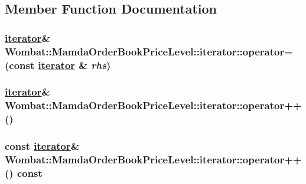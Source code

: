 \subsection{Member Function Documentation}
\hypertarget{classWombat_1_1MamdaOrderBookPriceLevel_1_1iterator_01e1214e92aa3b3a43ef784abdbb20c9}{
\subsubsection[operator=]{\setlength{\rightskip}{0pt plus 5cm}\hyperlink{classWombat_1_1MamdaOrderBookPriceLevel_1_1iterator}{iterator}\& Wombat::Mamda\-Order\-Book\-Price\-Level::iterator::operator= (const \hyperlink{classWombat_1_1MamdaOrderBookPriceLevel_1_1iterator}{iterator} \& {\em rhs})}}
\label{classWombat_1_1MamdaOrderBookPriceLevel_1_1iterator_01e1214e92aa3b3a43ef784abdbb20c9}


\hypertarget{classWombat_1_1MamdaOrderBookPriceLevel_1_1iterator_61c69420035a68e0d7af3339a1812a68}{
\subsubsection[operator++]{\setlength{\rightskip}{0pt plus 5cm}\hyperlink{classWombat_1_1MamdaOrderBookPriceLevel_1_1iterator}{iterator}\& Wombat::Mamda\-Order\-Book\-Price\-Level::iterator::operator++ ()}}
\label{classWombat_1_1MamdaOrderBookPriceLevel_1_1iterator_61c69420035a68e0d7af3339a1812a68}


\hypertarget{classWombat_1_1MamdaOrderBookPriceLevel_1_1iterator_7a1c25527e0ff2382a538267a21f819a}{
\subsubsection[operator++]{\setlength{\rightskip}{0pt plus 5cm}const \hyperlink{classWombat_1_1MamdaOrderBookPriceLevel_1_1iterator}{iterator}\& Wombat::Mamda\-Order\-Book\-Price\-Level::iterator::operator++ () const}}
\label{classWombat_1_1MamdaOrderBookPriceLevel_1_1iterator_7a1c25527e0ff2382a538267a21f819a}


